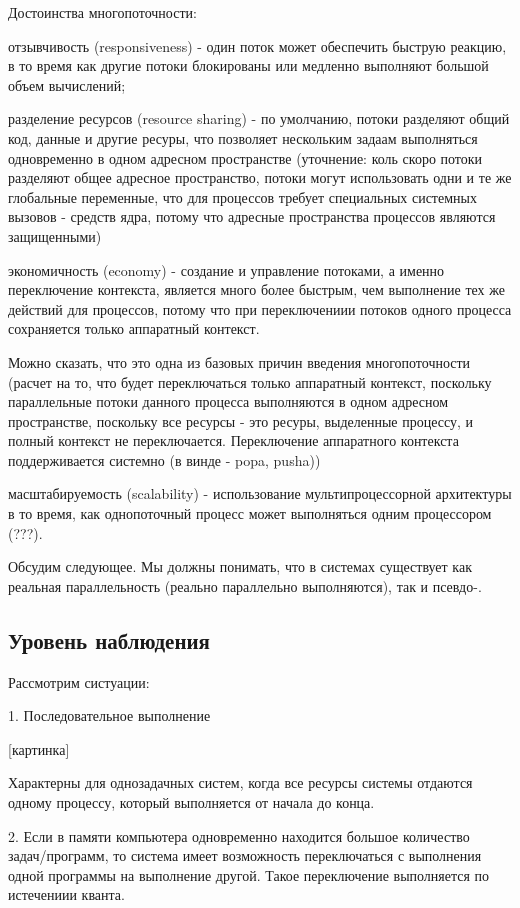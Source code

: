 \documentclass[a4paper, 12pt]{report}
\begin{document}
	Достоинства многопоточности:
	
	отзывчивость (responsiveness) - один поток может обеспечить быструю реакцию, в то время как другие потоки блокированы или медленно выполняют большой объем вычислений; 
	
	разделение ресурсов (resource sharing) - по умолчанию, потоки разделяют общий код, данные и другие ресуры, что позволяет нескольким задаам выполняться одновременно в одном адресном пространстве (уточнение: коль скоро потоки разделяют общее адресное пространство, потоки могут использовать одни и те же глобальные переменные, что для процессов требует специальных системных вызовов - средств ядра, потому что адресные пространства процессов  являются защищенными)
	
	экономичность (economy) - создание и управление потоками, а именно переключение контекста, является много более быстрым, чем выполнение тех же действий для процессов, потому что при переключениии потоков одного процесса сохраняется только аппаратный контекст.
	
	Можно сказать, что это одна из базовых причин введения многопоточности (расчет на то, что будет переключаться только аппаратный контекст, поскольку параллельные потоки данного процесса выполняются в одном адресном пространстве, поскольку все ресурсы - это ресуры, выделенные процессу, и полный контекст не переключается. Переключение аппаратного контекста поддерживается системно (в винде - popa, pusha))
	
	масштабируемость (scalability) - использование мультипроцессорной архитектуры в то время, как однопоточный процесс может выполняться одним процессором (???).
	
	Обсудим следующее. Мы должны понимать, что в системах существует как реальная параллельность (реально параллельно выполняются), так и псевдо-.
	
	\subsection*{Уровень наблюдения}
	
	Рассмотрим систуации:
	
	1. Последовательное выполнение
	
	[картинка]
	
	Характерны для однозадачных систем, когда все ресурсы системы отдаются одному процессу, который выполняется от начала до конца.
	
	2. Если в памяти компьютера одновременно находится большое количество задач/программ, то система имеет возможность переключаться с выполнения одной программы на выполнение другой. Такое переключение выполняется по истечениии кванта.
	
\end{document}
